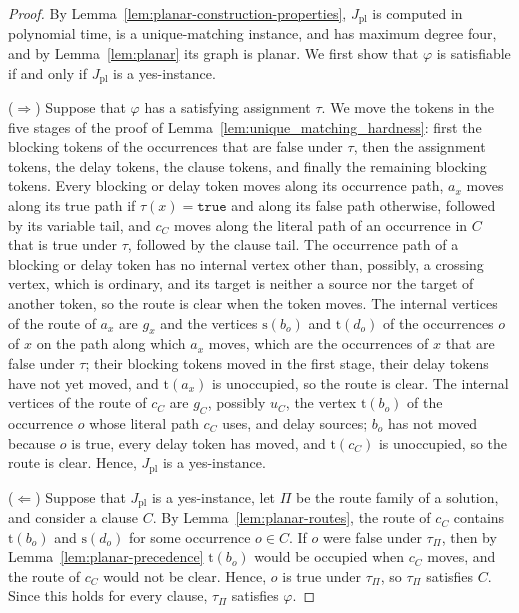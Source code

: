 \documentclass[a4paper,USenglish,thm-restate]{lipics-v2021}
\newcommand{\src}{\mathrm{s}}
\newcommand{\tgt}{\mathrm{t}}
\theoremstyle{problemstyle}
\begin{document}
\begin{proof}
By Lemma~\ref{lem:planar-construction-properties}, $J_{\mathrm{pl}}$ is
computed in polynomial time, is a unique-matching instance, and has maximum
degree four, and by Lemma~\ref{lem:planar} its graph is planar. We first
show that $\varphi$ is satisfiable if and only if $J_{\mathrm{pl}}$ is a
yes-instance.

\smallskip
\noindent
($\Rightarrow$) Suppose that $\varphi$ has a satisfying assignment $\tau$.
We move the tokens in the five stages of the proof of
Lemma~\ref{lem:unique_matching_hardness}: first the blocking tokens of the
occurrences that are false under $\tau$, then the assignment tokens, the
delay tokens, the clause tokens, and finally the remaining blocking tokens.
Every blocking or delay token moves along its occurrence path, $a_x$ moves
along its true path if $\tau(x)=\texttt{true}$ and along its false path
otherwise, followed by its variable tail, and $c_C$ moves along the literal
path of an occurrence in $C$ that is true under $\tau$, followed by the
clause tail. The occurrence path of a blocking or delay token has no
internal vertex other than, possibly, a crossing vertex, which is ordinary,
and its target is neither a source nor the target of another token, so the
route is clear when the token moves. The internal vertices of the route of
$a_x$ are $g_x$ and the vertices $\src(b_o)$ and $\tgt(d_o)$ of the
occurrences $o$ of $x$ on the path along which $a_x$ moves, which are the
occurrences of $x$ that are false under $\tau$; their blocking tokens moved
in the first stage, their delay tokens have not yet moved, and $\tgt(a_x)$
is unoccupied, so the route is clear. The internal vertices of the route of
$c_C$ are $g_C$, possibly $u_C$, the vertex $\tgt(b_o)$ of the occurrence
$o$ whose literal path $c_C$ uses, and delay sources; $b_o$ has not moved
because $o$ is true, every delay token has moved, and $\tgt(c_C)$ is
unoccupied, so the route is clear. Hence, $J_{\mathrm{pl}}$ is a
yes-instance.

\smallskip
\noindent
($\Leftarrow$) Suppose that $J_{\mathrm{pl}}$ is a yes-instance, let $\Pi$
be the route family of a solution, and consider a clause $C$. By
Lemma~\ref{lem:planar-routes}, the route of $c_C$ contains $\tgt(b_o)$ and
$\src(d_o)$ for some occurrence $o\in C$. If $o$ were false under
$\tau_\Pi$, then by Lemma~\ref{lem:planar-precedence} $\tgt(b_o)$ would be
occupied when $c_C$ moves, and the route of $c_C$ would not be clear.
Hence, $o$ is true under $\tau_\Pi$, so $\tau_\Pi$ satisfies $C$. Since
this holds for every clause, $\tau_\Pi$ satisfies $\varphi$.


\end{proof}
\end{document}
